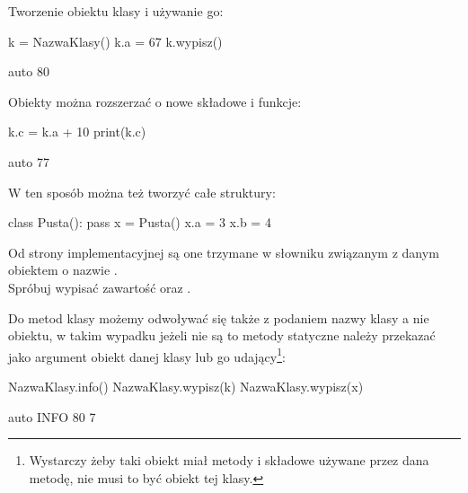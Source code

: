 Tworzenie obiektu klasy i używanie go:

\begin{CodeFrame}[python]{0.55\textwidth}
k = NazwaKlasy()
k.a = 67
k.wypisz()
\end{CodeFrame}
\begin{CodeFrame}{auto}
80
\end{CodeFrame}

Obiekty można rozszerzać o nowe składowe i funkcje:

\begin{CodeFrame}[python]{0.55\textwidth}
k.c = k.a + 10
print(k.c)
\end{CodeFrame}
\begin{CodeFrame}{auto}
77
\end{CodeFrame}

W ten sposób można też tworzyć całe struktury:\\
\begin{CodeFrame}[python]{0.55\textwidth}
class Pusta():
  pass
x = Pusta()
x.a = 3
x.b = 4
\end{CodeFrame}
\begin{minipage}[t]{0.4\textwidth}
\vspace{6pt}Od strony implementacyjnej są one trzymane w słowniku związanym z danym obiektem o nazwie .\\
Spróbuj wypisać zawartość  oraz .
\end{minipage}

Do metod klasy możemy odwoływać się także z podaniem nazwy klasy a nie obiektu, w takim wypadku jeżeli nie są to metody statyczne należy przekazać jako argument obiekt danej klasy
lub go udający\footnote{
Wystarczy żeby taki obiekt miał metody i składowe używane przez dana metodę, nie musi to być obiekt tej klasy.
}:

\begin{CodeFrame}[python]{0.55\textwidth}
NazwaKlasy.info()
NazwaKlasy.wypisz(k)
NazwaKlasy.wypisz(x)
\end{CodeFrame}
\begin{CodeFrame}{auto}
INFO
80
7
\end{CodeFrame}

